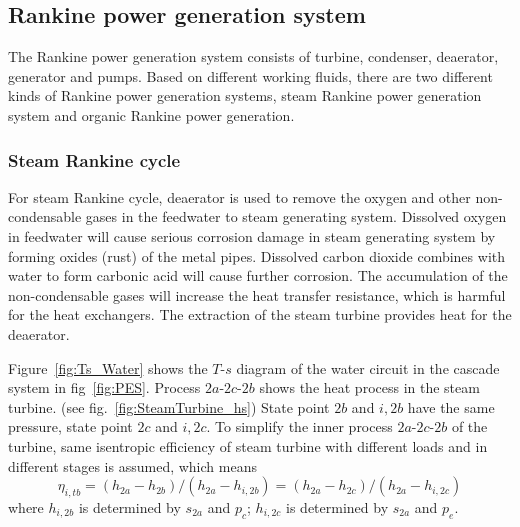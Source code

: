 \subsection{Rankine power generation system}

The Rankine power generation system consists of turbine, condenser, deaerator, generator and pumps. Based on different working fluids, there are two different kinds of Rankine power generation systems, steam Rankine power generation system and organic Rankine power generation.
\subsubsection{Steam Rankine cycle}
  
  For steam Rankine cycle, deaerator is used to remove the oxygen and other non-condensable gases in the feedwater to steam generating system. Dissolved oxygen in feedwater will cause serious corrosion damage in steam generating system by forming oxides (rust) of the metal pipes. Dissolved carbon dioxide combines with water to form carbonic acid will cause further corrosion. The accumulation of the non-condensable gases will increase the heat transfer resistance, which is harmful for the heat exchangers. The extraction of the steam turbine provides heat for the deaerator.
  
  Figure~\ref{fig:Ts_Water} shows the $T$-$s$ diagram of the water circuit in the cascade system in fig~\ref{fig:PES}. Process $2a$-$2c$-$2b$ shows the heat process in the steam turbine. (see fig.~\ref{fig:SteamTurbine_hs}) State point $2b$ and $i,2b$ have the same pressure, state point $2c$ and $i,2c$. To simplify the inner process $2a$-$2c$-$2b$ of the turbine, same isentropic efficiency of steam turbine with different loads and in different stages is assumed, which means  
  \begin{equation}
      \eta_{i,tb} =(h_{2a}-h_{2b})/(h_{2a}-h_{i,2b}) = (h_{2a}-h_{2c})/(h_{2a}-h_{i,2c})
\end{equation}
where $h_{i,2b}$ is determined by $s_{2a}$ and $p_c$; $h_{i,2c}$ is determined by $s_{2a}$ and $p_e$.


